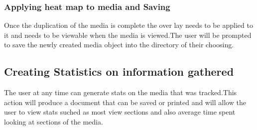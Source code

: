 \subsubsection{Applying heat map to media and Saving}
Once the duplication of the media is complete the over lay needs to be applied to it and needs to be viewable when the media is viewed.The user will be prompted to save the newly created media object into the directory of their choosing.
\subsection{Creating Statistics on information gathered}
The user at any time can generate stats on the  media that was tracked.This action will produce a document that can be saved or printed and will allow the user to view stats suched as most view sections and also average time spent looking at sections of the media.
